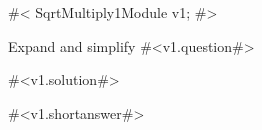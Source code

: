 

#<
SqrtMultiply1Module v1;
#>

Expand and simplify #<v1.question#>

#<v1.solution#>

#<v1.shortanswer#>



